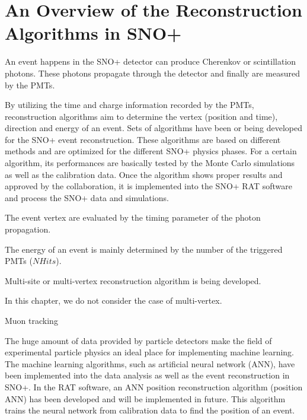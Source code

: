 
\section{An Overview of the Reconstruction Algorithms in SNO+}
An event happens in the SNO+ detector can produce Cherenkov or scintillation photons. These photons propagate through the detector and finally are measured by the PMTs.

By utilizing the time and charge information recorded by the PMTs, reconstruction algorithms aim to determine the vertex (position and time), direction and energy of an event. Sets of algorithms have been or being developed for the SNO+ event reconstruction. These algorithms are based on different methods and are optimized for the different SNO+ physics phases. For a certain algorithm, its performances are basically tested by the Monte Carlo simulations as well as the calibration data. Once the algorithm shows proper results and approved by the collaboration, it is implemented into the SNO+ RAT software and process the SNO+ data and simulations.

The event vertex are evaluated by the timing parameter of the photon propagation. 

The energy of an event is mainly determined by the number of the triggered PMTs ($NHits$). 

Multi-site or multi-vertex reconstruction algorithm is being developed.

In this chapter, we do not consider the case of multi-vertex.




Muon tracking


The huge amount of data provided by particle detectors make the field of experimental particle physics an ideal place for implementing machine learning. The machine learning algorithms, such as artificial neural network (ANN), have been implemented into the data analysis as well as the event reconstruction in SNO+. In the RAT software, an ANN position reconstruction algorithm (position ANN) has been developed and will be implemented in future. This algorithm trains the neural network from calibration data to find the position of an event.

